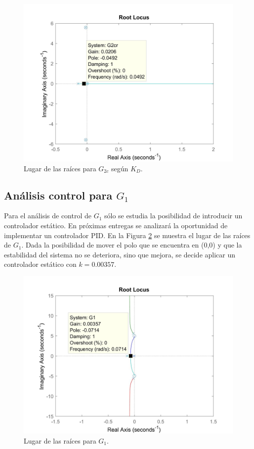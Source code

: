 \documentclass[journal]{IEEEtran}
\begin{document}
\begin{figure}[h!]
\caption{Lugar de las raíces para $G_{2c}$ según $K_D$.\label{fig:rlocusG2PID}}
  \centering
\includegraphics[scale=0.18]{control/PID_G2.jpg}
\end{figure}

\subsection{Análisis control para $G_1$}
Para el análisis de control de $G_1$ sólo se estudia la posibilidad de introducir un controlador estático. En próximas entregas se analizará la oportunidad de implementar un controlador PID. En la Figura \ref{fig:rlocusG1} se muestra el lugar de las raíces de $G_1$. Dada la posibilidad de mover el polo que se encuentra en (0,0) y que la estabilidad del sistema no se deteriora, sino que mejora, se decide aplicar un controlador estático con $k=0.00357$.\\   

\begin{figure}[h!]
\caption{Lugar de las raíces para $G_1$.\label{fig:rlocusG1}}
  \centering
\includegraphics[scale=0.18]{control/k_G1.jpg}
\end{figure}
\end{document}
